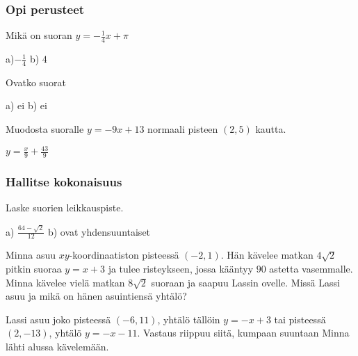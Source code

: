\begin{tehtavasivu}

\subsubsection*{Opi perusteet}

\begin {tehtava}
Mikä on suoran $y=-\frac{1}{4}x+\pi$
\begin {vastaus}
a)$-\frac{1}{4}$  b) $4$ 
\end {vastaus}
\end {tehtava}

\begin {tehtava}
Ovatko suorat 
\begin {vastaus}
a) ei b) ei
\end {vastaus}
\end {tehtava}

\begin {tehtava}
Muodosta suoralle $y=-9x+13$ normaali pisteen $(2, 5)$ kautta.
\begin {vastaus}
$y=\frac{x}{9}+\frac{43}{9}$
\end {vastaus}
\end {tehtava}

\subsubsection*{Hallitse kokonaisuus}

\begin {tehtava}
Laske suorien leikkauspiste.
\begin {vastaus}
a) $\frac{64-\sqrt{2}}{12}$ b) ovat yhdensuuntaiset
\end {vastaus}
\end {tehtava}

\begin {tehtava}
Minna asuu $xy$-koordinaatiston pisteessä $(-2, 1)$. Hän kävelee matkan $4\sqrt{2}$ pitkin suoraa $y=x+3$ ja tulee risteykseen, jossa kääntyy $90$ astetta vasemmalle. Minna kävelee vielä matkan $8\sqrt{2}$ suoraan ja saapuu Lassin ovelle. Missä Lassi asuu ja mikä on hänen asuintiensä yhtälö?
\begin {vastaus}
Lassi asuu joko pisteessä $(-6, 11)$, yhtälö tällöin $y=-x+3$ tai pisteessä $(2, -13)$, yhtälö $y=-x-11$. Vastaus riippuu siitä, kumpaan suuntaan Minna lähti alussa kävelemään.
\end {vastaus}
\end {tehtava}


\end{tehtavasivu}
